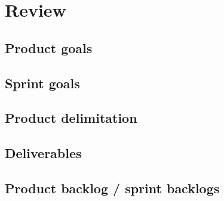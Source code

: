 \section{Review}\label{sec:review}

\subsection{Product goals}\label{subsec:product-goals-review}


\subsection{Sprint goals}\label{subsec:sprint-goals-review}


\subsection{Product delimitation}\label{subsec:product-delimination-review}


\subsection{Deliverables}\label{subsec:deliverables-review}


\subsection{Product backlog / sprint backlogs}\label{subsec:backlog-review}

